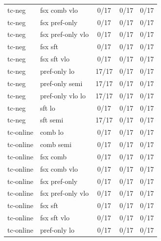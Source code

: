\documentclass[10pt,landscape]{article}
\begin{document}
\begin{tabular}{llccc}
tc-neg & fsx comb vlo & \cellcolor{missing}0/17 & \cellcolor{missing}0/17 & \cellcolor{missing}0/17 \\
tc-neg & fsx pref-only & \cellcolor{missing}0/17 & \cellcolor{missing}0/17 & \cellcolor{missing}0/17 \\
tc-neg & fsx pref-only vlo & \cellcolor{missing}0/17 & \cellcolor{missing}0/17 & \cellcolor{missing}0/17 \\
tc-neg & fsx sft & \cellcolor{missing}0/17 & \cellcolor{missing}0/17 & \cellcolor{missing}0/17 \\
tc-neg & fsx sft vlo & \cellcolor{missing}0/17 & \cellcolor{missing}0/17 & \cellcolor{missing}0/17 \\
tc-neg & pref-only lo & \cellcolor{done}17/17 & \cellcolor{missing}0/17 & \cellcolor{missing}0/17 \\
tc-neg & pref-only semi & \cellcolor{done}17/17 & \cellcolor{missing}0/17 & \cellcolor{missing}0/17 \\
tc-neg & pref-only vlo lo & \cellcolor{done}17/17 & \cellcolor{missing}0/17 & \cellcolor{missing}0/17 \\
tc-neg & sft lo & \cellcolor{missing}0/17 & \cellcolor{missing}0/17 & \cellcolor{missing}0/17 \\
tc-neg & sft semi & \cellcolor{done}17/17 & \cellcolor{missing}0/17 & \cellcolor{missing}0/17 \\
tc-online & comb lo & \cellcolor{missing}0/17 & \cellcolor{missing}0/17 & \cellcolor{missing}0/17 \\
tc-online & comb semi & \cellcolor{missing}0/17 & \cellcolor{missing}0/17 & \cellcolor{missing}0/17 \\
tc-online & fsx comb & \cellcolor{missing}0/17 & \cellcolor{missing}0/17 & \cellcolor{missing}0/17 \\
tc-online & fsx comb vlo & \cellcolor{missing}0/17 & \cellcolor{missing}0/17 & \cellcolor{missing}0/17 \\
tc-online & fsx pref-only & \cellcolor{missing}0/17 & \cellcolor{missing}0/17 & \cellcolor{missing}0/17 \\
tc-online & fsx pref-only vlo & \cellcolor{missing}0/17 & \cellcolor{missing}0/17 & \cellcolor{missing}0/17 \\
tc-online & fsx sft & \cellcolor{missing}0/17 & \cellcolor{missing}0/17 & \cellcolor{missing}0/17 \\
tc-online & fsx sft vlo & \cellcolor{missing}0/17 & \cellcolor{missing}0/17 & \cellcolor{missing}0/17 \\
tc-online & pref-only lo & \cellcolor{missing}0/17 & \cellcolor{missing}0/17 & \cellcolor{missing}0/17 \\

\end{tabular}
\end{document}
